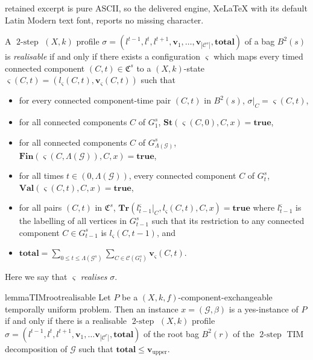 \documentclass[10pt,a4paper]{amsart}
\DeclareMathOperator{\twostep}{2-step}
\begin{document}
retained excerpt is pure ASCII, so the delivered engine, XeLaTeX with its default Latin Modern text font, reports no missing character.
\begin{defn}\label{def:realisable}
    A $\twostep$ $(X,k)$ profile $\sigma=(l^{t-1}, l^t, l^{t+1}, \textbf{v}_{1},\ldots,\textbf{v}_{|\mathcal{C}^s|}, \textbf{total})$ of a bag $B^2(s)$ is \emph{realisable} if and only if there exists a configuration $\varsigma$ which maps every timed connected component $(C,t)\in \mathfrak{C}^s$ to a $(X,k)$-state $\varsigma(C,t)=(l_{\varsigma}(C,t),\textbf{v}_{\varsigma}(C,t))$
    such that
    \begin{itemize}
        \item for every connected component-time pair $(C,t)$ in $B^2(s)$, $\sigma|_C=\varsigma(C,t)$,
        \item for all connected components $C$ of $G_1^s$, $\textbf{St}(\varsigma(C,0),C,x)=\textbf{true}$,
        \item for all connected components $C$ of $G^s_{\Lambda(\mathcal{G})}$, $\textbf{Fin}(\varsigma(C,\Lambda(\mathcal{G})),C,x)=\textbf{true}$,
        \item for all times $t\in(0,\Lambda(\mathcal{G}))$, every connected component $C$ of $G_{t}^s$, $\textbf{Val}(\varsigma(C,t),C,x)=\textbf{true}$,
        \item for all pairs $(C,t)$ in $\mathfrak{C}^s$, $\textbf{Tr}(l^{\varsigma}_{t-1}|_C,l_{\varsigma}(C,t),C,x)=\textbf{true}$ where $l^{\varsigma}_{t-1}$ is the labelling of all vertices in $G^s_{t-1}$ such that its restriction to any connected component $C\in G_{t-1}^s$ is $l_{\varsigma}(C,t-1)$, and
        \item $\textbf{total}= \sum_{0\leq t\leq \Lambda(\mathcal{G}^s)} \sum _{C \in \mathcal{C}(G^s_t)} \textbf{v}_{\varsigma}(C,t)$.
    \end{itemize}
    Here we say that $\varsigma$ \emph{realises} $\sigma$.
\end{defn}

\begin{restatable}{lemma}{TIMrootrealisable}\label{lem:TIM-root-realisable}
    Let $P$ be a $(X,k,f)$-component-exchangeable temporally uniform problem. Then an instance $x=(\mathcal{G},\beta)$ is a yes-instance of $P$ if and only if there is a realisable $\twostep$ $(X,k)$ profile $\sigma=(l^{t-1},l^t,l^{t+1},\textbf{v}_1,\ldots\textbf{v}_{|\mathcal{C}^r|}, \textbf{total})$ of the root bag $B^2(r)$ of the $\twostep$ TIM decomposition of $\mathcal{G}$ such that $\textbf{total}\leq \textbf{v}_{\text{upper}}$.
\end{restatable}
\end{document}
